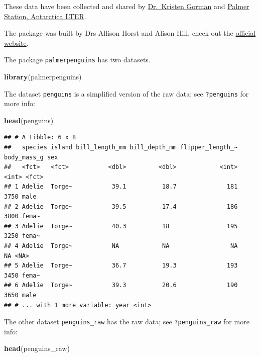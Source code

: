 \documentclass[
  12pt,
]{book}
\newenvironment{Shaded}{\begin{snugshade}}{\end{snugshade}}
\newcommand{\KeywordTok}[1]{\textcolor[rgb]{0.13,0.29,0.53}{\textbf{#1}}}
\newcommand{\NormalTok}[1]{#1}
\begin{document}
These data have been collected and shared by \href{https://www.uaf.edu/cfos/people/faculty/detail/kristen-gorman.php}{Dr.~Kristen Gorman} and \href{https://pal.lternet.edu/}{Palmer Station, Antarctica LTER}.

The package was built by Drs Allison Horst and Alison Hill, check out the \href{https://allisonhorst.github.io/palmerpenguins/}{official website}.

The package \texttt{palmerpenguins} has two datasets.

\begin{Shaded}
\begin{Highlighting}[]
\KeywordTok{library}\NormalTok{(palmerpenguins)}
\end{Highlighting}
\end{Shaded}

The dataset \texttt{penguins} is a simplified version of the raw data; see \texttt{?penguins} for more info:

\begin{Shaded}
\begin{Highlighting}[]
\KeywordTok{head}\NormalTok{(penguins)}
\end{Highlighting}
\end{Shaded}

\begin{verbatim}
## # A tibble: 6 x 8
##   species island bill_length_mm bill_depth_mm flipper_length_~ body_mass_g sex  
##   <fct>   <fct>           <dbl>         <dbl>            <int>       <int> <fct>
## 1 Adelie  Torge~           39.1          18.7              181        3750 male 
## 2 Adelie  Torge~           39.5          17.4              186        3800 fema~
## 3 Adelie  Torge~           40.3          18                195        3250 fema~
## 4 Adelie  Torge~           NA            NA                 NA          NA <NA> 
## 5 Adelie  Torge~           36.7          19.3              193        3450 fema~
## 6 Adelie  Torge~           39.3          20.6              190        3650 male 
## # ... with 1 more variable: year <int>
\end{verbatim}

The other dataset \texttt{penguins\_raw} has the raw data; see \texttt{?penguins\_raw} for more info:

\begin{Shaded}
\begin{Highlighting}[]
\KeywordTok{head}\NormalTok{(penguins_raw)}
\end{Highlighting}
\end{Shaded}
\end{document}
